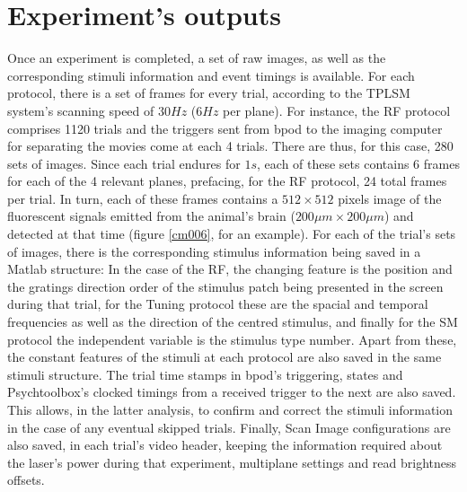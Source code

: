 \section{Experiment's outputs}
\label{sec:Experimentsoutputs}

Once an experiment is completed, a set of raw images, as well as the corresponding stimuli information and event timings is available. For each protocol, there is a set of frames for every trial, according to the TPLSM system's scanning speed of $30 Hz$ ($6 Hz$ per plane). 
For instance, the RF protocol comprises 1120 trials and the triggers sent from bpod to the imaging computer for separating the movies come at each 4 trials. There are thus, for this case, 280 sets of images. Since each trial endures for $1s$, each of these sets contains 6 frames for each of the 4 relevant planes, prefacing, for the RF protocol, 24 total frames per trial. In turn, each of these frames contains a $512 \times 512$ pixels image of the fluorescent signals emitted from the animal's brain ($200 \mu m \times 200 \mu m$) and detected at that time (figure \ref{cm006}, for an example).
For each of the trial's sets of images, there is the corresponding stimulus information being saved in a Matlab structure: In the case of the RF, the changing feature is the position and the gratings direction order of the stimulus patch being presented in the screen during that trial, for the Tuning protocol these are the spacial and temporal frequencies as well as the direction of the centred stimulus, and finally for the SM protocol the independent variable is the stimulus type number. Apart from these, the constant features of the stimuli at each protocol are also saved in the same stimuli structure. 
The trial time stamps in bpod's triggering, states and Psychtoolbox's clocked timings from a received trigger to the next are also saved. This allows, in the latter analysis, to confirm and correct the stimuli information in the case of any eventual skipped trials.
Finally, Scan Image configurations are also saved, in each trial's video header, keeping the information required about the laser's power during that experiment, multiplane settings and read brightness offsets.

